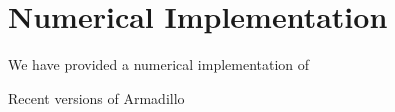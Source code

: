 \section{Numerical Implementation}


We have provided a numerical implementation of 

Recent versions of Armadillo
